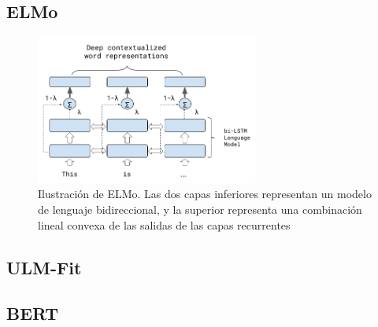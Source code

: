 \subsection{ELMo}
\begin{figure}
    \centering
    \includegraphics[width=0.65\textwidth]{img/ELMo.png}
    \caption{Ilustración de ELMo. Las dos capas inferiores representan un modelo de lenguaje bidireccional, y la superior representa una combinación lineal convexa de las salidas de las capas recurrentes}
    \label{fig:modelos_offenseval_hateval}
\end{figure}
\subsection{ULM-Fit}
\subsection{BERT}